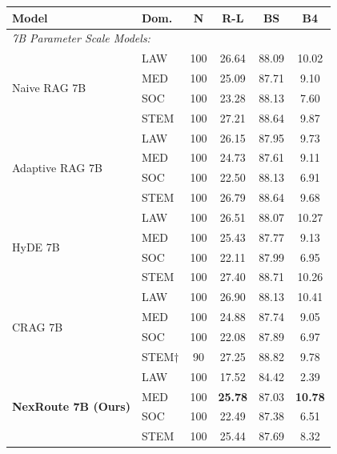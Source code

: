 \documentclass[a4paper,fleql]{cas-sc}
\begin{document}
\begin{center}
\begingroup
\small %
\renewcommand{\arraystretch}{0.9} %
\label{tab:domain_breakdown}
\begin{tabular}{llcccc}
\toprule
\textbf{Model} & \textbf{Dom.} & \textbf{N} & \textbf{R-L} & \textbf{BS} & \textbf{B4} \\
\midrule
\multicolumn{6}{l}{\textit{7B Parameter Scale Models:}} \\
\multirow{4}{*}{Naive RAG 7B}
  & LAW  & 100 & 26.64 & 88.09 & 10.02 \\
  & MED  & 100 & 25.09 & 87.71 &  9.10 \\
  & SOC  & 100 & 23.28 & 88.13 &  7.60 \\
  & STEM & 100 & 27.21 & 88.64 &  9.87 \\
\midrule
\multirow{4}{*}{Adaptive RAG 7B}
  & LAW  & 100 & 26.15 & 87.95 &  9.73 \\
  & MED  & 100 & 24.73 & 87.61 &  9.11 \\
  & SOC  & 100 & 22.50 & 88.13 &  6.91 \\
  & STEM & 100 & 26.79 & 88.64 &  9.68 \\
\midrule
\multirow{4}{*}{HyDE 7B}
  & LAW  & 100 & 26.51 & 88.07 & 10.27 \\
  & MED  & 100 & 25.43 & 87.77 &  9.13 \\
  & SOC  & 100 & 22.11 & 87.99 &  6.95 \\
  & STEM & 100 & 27.40 & 88.71 & 10.26 \\
\midrule
\multirow{4}{*}{CRAG 7B}
  & LAW  & 100 & 26.90 & 88.13 & 10.41 \\
  & MED  & 100 & 24.88 & 87.74 &  9.05 \\
  & SOC  & 100 & 22.08 & 87.89 &  6.97 \\
  & STEM$\dagger$ &  90 & 27.25 & 88.82 &  9.78 \\
\midrule
\multirow{4}{*}{\textbf{NexRoute 7B (Ours)}}
  & LAW  & 100 & 17.52 & 84.42 &  2.39 \\
  & MED  & 100 & \textbf{25.78} & 87.03 & \textbf{10.78} \\
  & SOC  & 100 & 22.49 & 87.38 &  6.51 \\
  & STEM & 100 & 25.44 & 87.69 &  8.32 \\
\bottomrule
\end{tabular}
\endgroup
\end{center}
\end{document}
